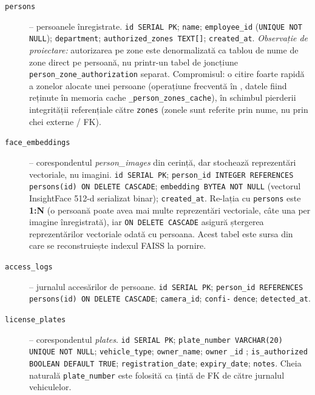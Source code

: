 \documentclass[../../main.tex]{subfiles}
\begin{document}
\begin{description}
	\item[\texttt{persons}] -- persoanele înregistrate. \texttt{id SERIAL PK}; \texttt{name}; \texttt{employee\_id} \linebreak (\texttt{UNIQUE NOT NULL}); \texttt{department}; \texttt{authorized\_zones TEXT[]}; \linebreak \texttt{created\_at}. \emph{Observație de proiectare:} autorizarea pe zone este denormalizată ca tablou de nume de zone direct pe persoană, nu printr-un tabel de joncțiune \texttt{person\_zone\_authorization} separat. Compromisul: o citire foarte rapidă a zonelor alocate unei persoane (operațiune frecventă în , datele fiind reținute în memoria cache \texttt{\_person\_zones\_cache}), în schimbul pierderii integrității referențiale către \texttt{zones} (zonele sunt referite prin nume, nu prin chei externe / FK).

    \item[\texttt{face\_embeddings}] -- corespondentul \emph{person\_images} din cerință, dar stochează reprezentări vectoriale, nu imagini. \texttt{id SERIAL PK}; \texttt{person\_id INTEGER \linebreak REFERENCES persons(id) ON DELETE CASCADE}; \texttt{embedding BYTEA \linebreak NOT NULL} (vectorul InsightFace 512-d serializat binar); \texttt{created\_at}. Re-lația cu \texttt{persons} este \textbf{1:N} (o persoană poate avea mai multe reprezentări vectoriale, câte una per imagine înregistrată), iar \texttt{ON DELETE CASCADE} asigură ștergerea reprezentărilor vectoriale odată cu persoana. Acest tabel este sursa din care se reconstruiește indexul FAISS la pornire.

    \item[\texttt{access\_logs}] -- jurnalul accesărilor de persoane. \texttt{id SERIAL PK}; \texttt{person\_id REFERENCES persons(id) ON DELETE CASCADE}; \texttt{camera\_id}; \texttt{confi-} \texttt{dence}; \texttt{detected\_at}.

    \item[\texttt{license\_plates}] -- corespondentul \emph{plates}. \texttt{id SERIAL PK}; \texttt{plate\_number \linebreak VARCHAR(20) UNIQUE NOT NULL}; \texttt{vehicle\_type}; \texttt{owner\_name}; \texttt{owner} \texttt{\_id} ; \texttt{is\_authorized BOOLEAN DEFAULT TRUE}; \texttt{registration\_date}; \texttt{expiry\_date}; \texttt{notes}. Cheia naturală \texttt{plate\_number} este folosită ca țintă de FK de către jurnalul vehiculelor.


\end{description}
\end{document}
